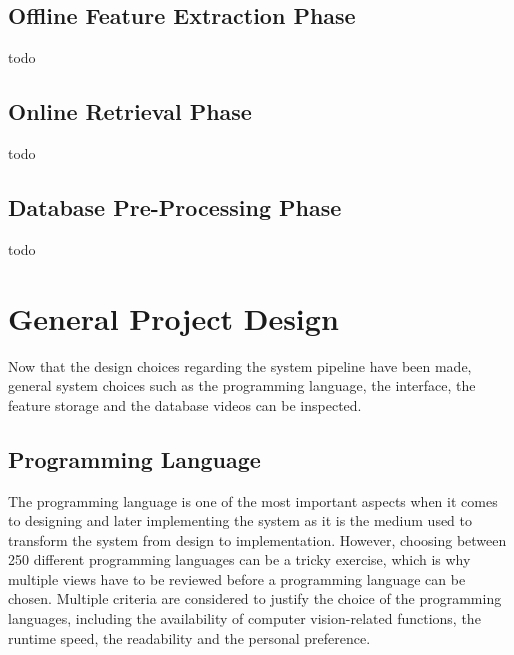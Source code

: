 \subsection{Offline Feature Extraction Phase}

todo

\subsection{Online Retrieval Phase}

todo

\subsection{Database Pre-Processing Phase}

todo

\section{General Project Design}

Now that the design choices regarding the system pipeline have been made, general system choices such as the programming language, the interface, the feature storage and the database videos can be inspected.

\subsection{Programming Language}

The programming language is one of the most important aspects when it comes to designing and later implementing the system as it is the medium used to transform the system from design to implementation. However, choosing between 250 different programming languages \cite{tiobe} can be a tricky exercise, which is why multiple views have to be reviewed before a programming language can be chosen. Multiple criteria are considered to justify the choice of the programming languages, including the availability of computer vision-related functions, the runtime speed, the readability and the personal preference.\\

